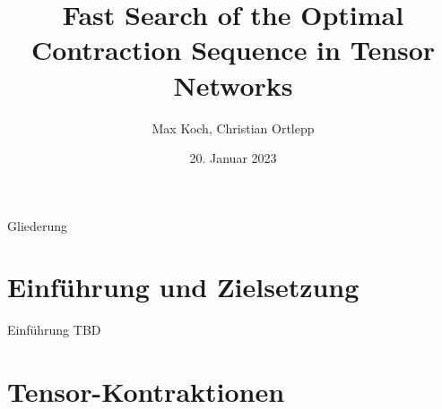 \documentclass{beamer}
\title{Fast Search of the Optimal Contraction Sequence in Tensor Networks}
\author{Max Koch, Christian Ortlepp}
\institute{Friedrich-Schiller-Universität Jena}
\date{20. Januar 2023}
\begin{document}
\begin{frame}
	\titlepage
  \end{frame}

\begin{frame}{Gliederung}
	\tableofcontents
\end{frame}

\section{Einführung und Zielsetzung}
\begin{frame}{Einführung}
	TBD
\end{frame}

\section{Tensor-Kontraktionen}
\end{document}
